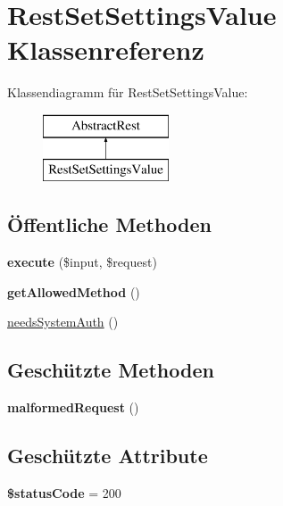 \hypertarget{class_rest_set_settings_value}{}\section{Rest\+Set\+Settings\+Value Klassenreferenz}
\label{class_rest_set_settings_value}
Klassendiagramm für Rest\+Set\+Settings\+Value\+:\begin{figure}[H]
\begin{center}
\leavevmode
\includegraphics[height=2.000000cm]{class_rest_set_settings_value}
\end{center}
\end{figure}
\subsection*{Öffentliche Methoden}
\begin{DoxyCompactItemize}
\item 
\mbox{\label{class_rest_set_settings_value_a662c91e20d1e22e6587a1dfb7a3db248}} 
{\bfseries execute} (\$input, \$request)
\item 
\mbox{\label{class_rest_set_settings_value_a328da3a9b8fc73fcdff5b21a47454f24}} 
{\bfseries get\+Allowed\+Method} ()
\item 
\mbox{\hyperlink{class_rest_set_settings_value_a8607df6fc01b30e9915e64e4191259d6}{needs\+System\+Auth}} ()
\end{DoxyCompactItemize}
\subsection*{Geschützte Methoden}
\begin{DoxyCompactItemize}
\item 
\mbox{\label{class_rest_set_settings_value_a8a804ead4b1d50778ea87f180137b638}} 
{\bfseries malformed\+Request} ()
\end{DoxyCompactItemize}
\subsection*{Geschützte Attribute}
\begin{DoxyCompactItemize}
\item 
\mbox{\label{class_rest_set_settings_value_adcd8fd6621d60212ef82d2906b83fb61}} 
{\bfseries \$status\+Code} = 200
\end{DoxyCompactItemize}


